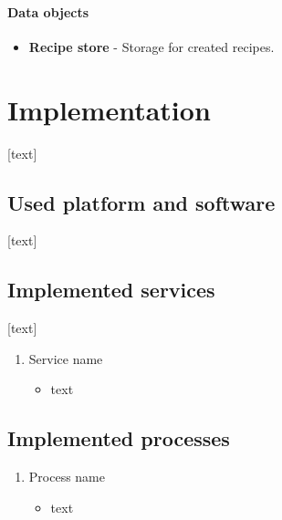 \documentclass[11pt,a4paper]{article}
\begin{document}
\paragraph{Data objects}

\begin{itemize}
    \item \textbf{Recipe store} - Storage for created recipes.
\end{itemize}

\newpage




\section{Implementation}

[text]


\subsection{Used platform and software}

[text]


\subsection{Implemented services}

[text]

\begin{enumerate}
    \item Service name
    \begin{itemize}
        \item text
    \end{itemize}
\end{enumerate}


\subsection{Implemented processes}

\begin{enumerate}
    \item Process name
    \begin{itemize}
        \item text
    \end{itemize}
\end{enumerate}
\end{document}
